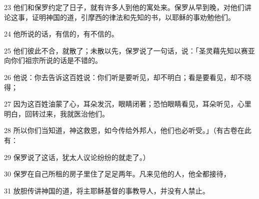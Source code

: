 \par 23 他们和保罗约定了日子，就有许多人到他的寓处来。保罗从早到晚，对他们讲论这事，证明神国的道，引摩西的律法和先知的书，以耶稣的事劝勉他们。
\par 24 他所说的话，有信的，有不信的。
\par 25 他们彼此不合，就散了；未散以先，保罗说了一句话，说：「圣灵藉先知以赛亚向你们祖宗所说的话是不错的。
\par 26 他说：你去告诉这百姓说：你们听是要听见，却不明白；看是要看见，却不晓得；
\par 27 因为这百姓油蒙了心，耳朵发沉，眼睛闭著；恐怕眼睛看见，耳朵听见，心里明白，回转过来，我就医治他们。
\par 28 所以你们当知道，神这救恩，如今传给外邦人，他们也必听受。」（有古卷在此有：
\par 29 保罗说了这话，犹太人议论纷纷的就走了。）
\par 30 保罗在自己所租的房子里住了足足两年。凡来见他的人，他全都接待，
\par 31 放胆传讲神国的道，将主耶稣基督的事教导人，并没有人禁止。


